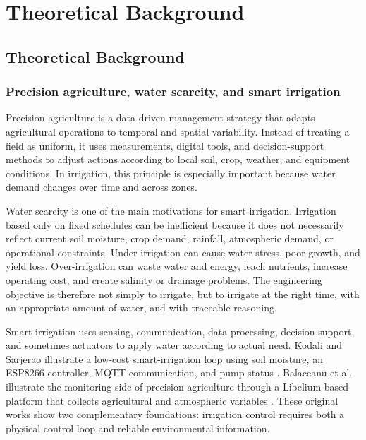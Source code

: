 \part{Theoretical Background}

\chapter{Theoretical Background}
\label{chap:theoretical_background}

\section{Precision agriculture, water scarcity, and smart irrigation}

Precision agriculture is a data-driven management strategy that adapts agricultural operations to temporal and spatial variability. Instead of treating a field as uniform, it uses measurements, digital tools, and decision-support methods to adjust actions according to local soil, crop, weather, and equipment conditions. In irrigation, this principle is especially important because water demand changes over time and across zones.

Water scarcity is one of the main motivations for smart irrigation. Irrigation based only on fixed schedules can be inefficient because it does not necessarily reflect current soil moisture, crop demand, rainfall, atmospheric demand, or operational constraints. Under-irrigation can cause water stress, poor growth, and yield loss. Over-irrigation can waste water and energy, leach nutrients, increase operating cost, and create salinity or drainage problems. The engineering objective is therefore not simply to irrigate, but to irrigate at the right time, with an appropriate amount of water, and with traceable reasoning.

Smart irrigation uses sensing, communication, data processing, decision support, and sometimes actuators to apply water according to actual need. Kodali and Sarjerao illustrate a low-cost smart-irrigation loop using soil moisture, an ESP8266 controller, MQTT communication, and pump status \cite{kodali2017mqttirrigation}. Balaceanu et al. illustrate the monitoring side of precision agriculture through a Libelium-based platform that collects agricultural and atmospheric variables \cite{balaceanu2019libelium}. These original works show two complementary foundations: irrigation control requires both a physical control loop and reliable environmental information.

